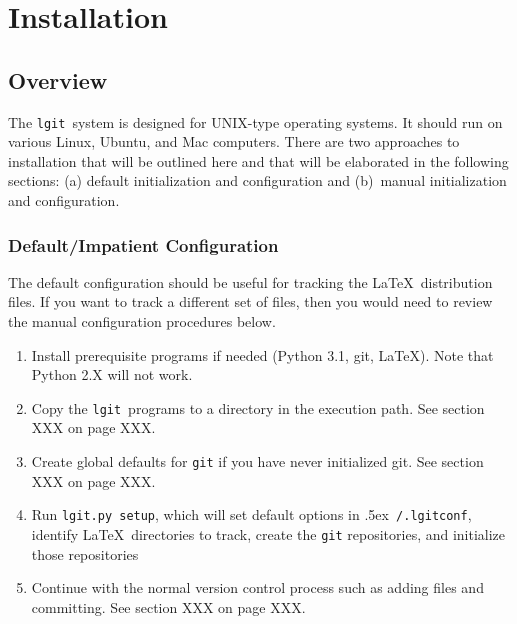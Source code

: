 \documentclass{ltxdoc}
\def\bobtilde{\lower.5ex\hbox{\tt \string~}}%
\def\ucmd#1{{\tt {#1}}}
\def\lgitconf{\bobtilde\ucmd{/.lgitconf}}
\def\lgit{{\tt lgit}}
\begin{document}
\section{Installation}
\subsection{Overview}
The \lgit\ system is designed for UNIX-type operating systems.  It should run on various Linux, Ubuntu, and Mac computers. There are two approaches to installation that will be outlined here and that will be elaborated in the following sections: (a) default initialization and configuration and (b)~manual initialization and configuration.
\subsubsection{Default/Impatient Configuration}
The default configuration should be useful for tracking the \LaTeX\ distribution files.  If you want to track a different set of files, then you would need to review the manual configuration procedures below.
\begin{enumerate}
\item{Install prerequisite programs if needed (Python 3.1, git, \LaTeX).  Note     that Python 2.X will not work.}
\item{Copy the \lgit\ programs to a directory in the execution path.  See section XXX on page XXX.}
\item{Create global defaults for \ucmd{git} if you have never initialized git.  See section XXX on page XXX.}
\item{Run \ucmd{lgit.py setup}, which will set default options in \lgitconf,     identify \LaTeX\ directories to track, create the \ucmd{git} repositories,     and initialize those repositories}
\item{Continue with the normal version control process such as adding files     and committing.  See section XXX on page XXX.}
\end{enumerate}
\end{document}
